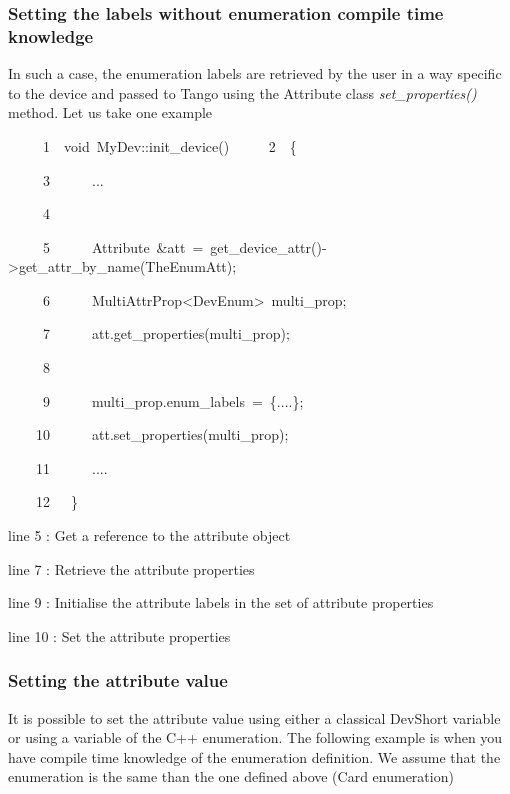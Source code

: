 \subsubsection{Setting the labels without enumeration compile time knowledge}

In such a case, the enumeration labels are retrieved by the user in
a way specific to the device and passed to Tango using the Attribute
class \emph{set\_properties()} method. Let us take one example



\begin{lyxcode}
~~~~~1~~void~MyDev::init\_device()
~~~~~2~~\{

~~~~~3~~~~~~...

~~~~~4~~

~~~~~5~~~~~~Attribute~\&att~=~get\_device\_attr()->get\_attr\_by\_name(\textquotedbl{}TheEnumAtt\textquotedbl{});

~~~~~6~~~~~~MultiAttrProp<DevEnum>~multi\_prop;

~~~~~7~~~~~~att.get\_properties(multi\_prop);

~~~~~8~

~~~~~9~~~~~~multi\_prop.enum\_labels~=~\{....\};

~~~~10~~~~~~att.set\_properties(multi\_prop);

~~~~11~~~~~~....

~~~~12~~~\}	
\end{lyxcode}


line 5 : Get a reference to the attribute object

line 7 : Retrieve the attribute properties

line 9 : Initialise the attribute labels in the set of attribute properties

line 10 : Set the attribute properties

\subsubsection{Setting the attribute value}

It is possible to set the attribute value using either a classical
DevShort variable or using a variable of the C++ enumeration. The
following example is when you have compile time knowledge of the enumeration
definition. We assume that the enumeration is the same than the one
defined above (Card enumeration)



